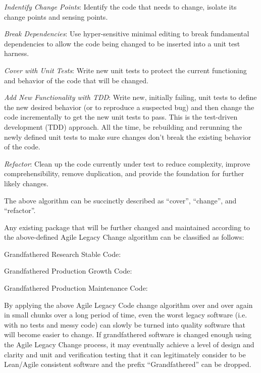\documentclass[11pt]{SANDreport}
\begin{document}
\begin{compactenum}

{}\item\textit{Indentify Change Points}: Identify the code that needs
to change, isolate its change points and sensing points.

{}\item\textit{Break Dependencies}: Use hyper-sensitive minimal
editing to break fundamental dependencies to allow the code being
changed to be inserted into a unit test harness.

{}\item\textit{Cover with Unit Tests}: Write new unit tests to protect
the current functioning and behavior of the code that will be changed.

{}\item\textit{Add New Functionality with TDD}: Write new, initially
failing, unit tests to define the new desired behavior (or to reproduce
a suspected bug) and then change the code incrementally to get the new
unit tests to pass.  This is the test-driven development (TDD)
approach.  All the time, be rebuilding and rerunning the newly defined
unit tests to make sure changes don't break the existing behavior of
the code.

{}\item\textit{Refactor}: Clean up the code currently under test to
reduce complexity, improve comprehensibility, remove duplication, and
provide the foundation for further likely changes.

\end{compactenum}

The above algorithm can be succinctly described as ``cover'', ``change'', and
``refactor''.

Any existing package that will be further changed and maintained
according to the above-defined Agile Legacy Change algorithm can be
classified as follows:

\begin{compactenum}

{}\item Grandfathered Research Stable Code:

{}\item Grandfathered Production Growth Code:

{}\item Grandfathered Production Maintenance Code:

\end{compactenum}

By applying the above Agile Legacy Code change algorithm over and over
again in small chunks over a long period of time, even the worst
legacy software (i.e. with no tests and messy code) can slowly be
turned into quality software that will become easier to change.  If
grandfathered software is changed enough using the Agile Legacy Change
process, it may eventually achieve a level of design and clarity and
unit and verification testing that it can legitimately consider to be
Lean/Agile consistent software and the prefix ``Grandfathered'' can be
dropped.
\end{document}
